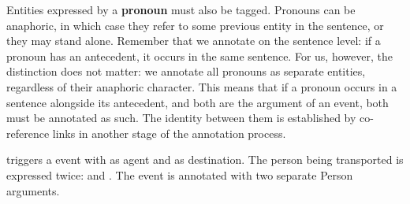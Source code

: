 \begin{exe}
    \ex {}
        \expl {} 
        \expl {} 
        \expl {} 
        \expl {} 
        \expl {} 
        \expl {} 
\end{exe}

Entities expressed by a \textbf{pronoun} must also be tagged. Pronouns can be anaphoric, in which case they refer to some previous entity in the sentence, or they may stand alone. Remember that we annotate on the sentence level: if a pronoun has an antecedent, it occurs in the same sentence. For us, however, the distinction does not matter: we annotate all pronouns as separate entities, regardless of their anaphoric character. This means that if a pronoun occurs in a sentence alongside its antecedent, and both are the argument of an event, both must be annotated as such. The identity between them is established by co-reference links in another stage of the annotation process.

\begin{exe}
    \ex {} 
    \expl {} triggers a  event with  as agent and  as destination. The person being transported is expressed twice:  and . The event is annotated with two separate Person arguments.
    
\end{exe}






